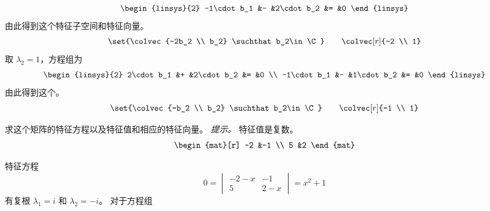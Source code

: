 \begin{exercises}
\begin{answer}
\begin{exparts}
\begin{equation*}
\begin{linsys}{2}
               -1\cdot b_1  &-  &2\cdot b_2  &=  &0
             \end{linsys}
           \end{equation*}
           由此得到这个特征子空间和特征向量。
           \begin{equation*}
             \set{\colvec{-2b_2 \\ b_2}
                   \suchthat b_2\in\C}
             \qquad
             \colvec[r]{-2 \\ 1}
           \end{equation*}
           取 $\lambda_2=1$，方程组为
           \begin{equation*}
             \begin{linsys}{2}
                2\cdot b_1  &+  &2\cdot b_2  &=  &0  \\
               -1\cdot b_1  &-  &1\cdot b_2  &=  &0
             \end{linsys}
           \end{equation*}
           由此得到这个。
           \begin{equation*}
             \set{\colvec{-b_2 \\ b_2}
                   \suchthat b_2\in\C}
             \qquad
             \colvec[r]{-1 \\ 1}
           \end{equation*}
       \end{exparts}  
     \end{answer}
  \item
     求这个矩阵的特征方程以及特征值和相应的特征向量。
     \textit{提示。}
       特征值是复数。
     \begin{equation*}
       \begin{mat}[r]
         -2  &-1 \\
          5  &2
      \end{mat}  
    \end{equation*}
    \begin{answer}
         特征方程
           \begin{equation*}
             0=
             \begin{vmatrix}
               -2-x  &-1  \\
               5     &2-x               
             \end{vmatrix}
             =x^2+1
           \end{equation*}
           有复根 $\lambda_1=i$ 和 $\lambda_2=-i$。
           对于方程组
           \begin{equation*}

\end{equation*}
\end{answer}
\end{exercises}
